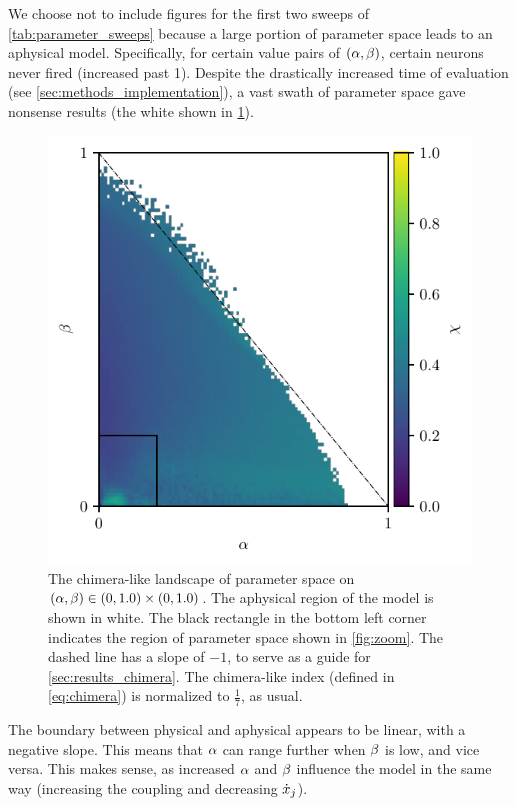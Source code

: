 We choose not to include figures for the first two sweeps of \cref{tab:parameter_sweeps} because a large portion of parameter space leads to an aphysical model.
Specifically, for certain value pairs of $\pqty{\hra, \hrb}$, certain neurons never fired (increased past 1).
Despite the drastically increased time of evaluation (see \cref{sec:methods_implementation}), a vast swath of parameter space gave nonsense results (the white shown in \cref{fig:aphysical_chimera}).
\begin{figure}[ht]
  \centering
  \includegraphics[width=\columnwidth]{figure/aphysical_chimera_100dpi.pdf}
  \caption[Chimera-like index landscape]{
    The chimera-like landscape of parameter space on $\pqty{\hra, \hrb} \in \pqty{0, 1.0} \times \pqty{0, 1.0}$.
    The aphysical region of the model is shown in white.
    The black rectangle in the bottom left corner indicates the region of parameter space shown in \cref{fig:zoom}.
    The dashed line has a slope of $-1$, to serve as a guide for \cref{sec:results_chimera}.
    The chimera-like index (defined in \cref{eq:chimera}) is normalized to $\frac{1}{7}$, as usual.
  }
  \label{fig:aphysical_chimera}
\end{figure}
The boundary between physical and aphysical appears to be linear, with a negative slope.
This means that $\alpha$ can range further when $\beta$ is low,
and vice versa.
This makes sense, as increased $\alpha$ and $\beta$ influence the model in the same way (increasing the coupling and decreasing $\dot{x}_{j}$).

